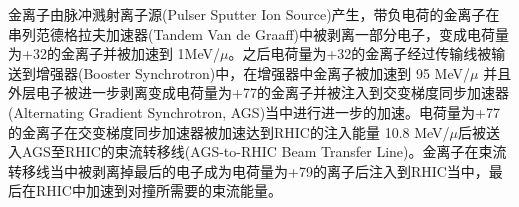 金离子由脉冲溅射离子源(Pulser Sputter Ion Source)产生，带负电荷的金离子在串列范德格拉夫加速器(Tandem Van de Graaff)中被剥离一部分电子，变成电荷量为+32的金离子并被加速到 1MeV/$\mu$。之后电荷量为+32的金离子经过传输线被输送到增强器(Booster Synchrotron)中，在增强器中金离子被加速到 95 MeV/$\mu$ 并且外层电子被进一步剥离变成电荷量为+77的金离子并被注入到交变梯度同步加速器(Alternating Gradient Synchrotron, AGS)当中进行进一步的加速。电荷量为+77的金离子在交变梯度同步加速器被加速达到RHIC的注入能量 10.8 MeV/$\mu$后被送入AGS至RHIC的束流转移线(AGS-to-RHIC Beam Transfer Line)。金离子在束流转移线当中被剥离掉最后的电子成为电荷量为+79的离子后注入到RHIC当中，最后在RHIC中加速到对撞所需要的束流能量。